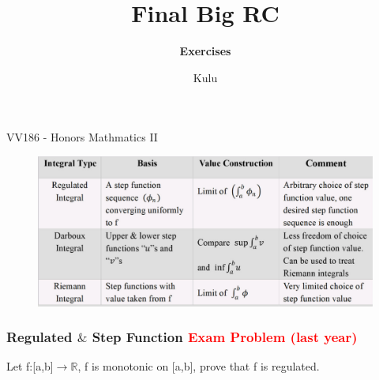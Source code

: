 \documentclass{beamer}
\title{\sffamily Final Big RC}
\subtitle{\textbf{Exercises}\\ }
\institute[UM-SJTU JI]{University of Michigan-Shanghai Jiao Tong University Joint Institute}
\author{Kulu}
\newcommand{\myfont}{\rmfamily\normalsize\upshape\mdseries}
\begin{document}
\begin{titlepage}
    \begin{center}
        VV186 - Honors Mathmatics II
    \end{center}
\end{titlepage}
\myfont

\begin{frame}
    \begin{figure}[htbp]
        \centering
        \includegraphics[width=12cm]{integral.png}
    \end{figure}
\end{frame}

\begin{frame}
    \frametitle{Regulated $\&$ Step Function \textcolor{red}{Exam Problem (last year)}}
    Let f:[a,b]$\to \mathbb{R}$, f is monotonic on [a,b], prove that f is regulated.

\end{frame}
\end{document}
